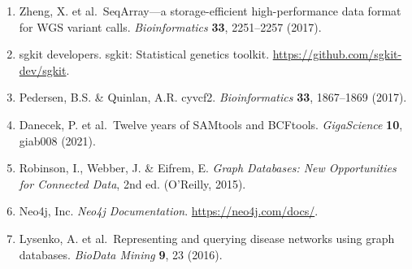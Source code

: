 \documentclass[11pt,a4paper]{article}
\begin{document}
\begin{enumerate}
\item[{[S11]}] Zheng, X. et al.\ SeqArray---a storage-efficient high-performance data format for WGS variant calls. \textit{Bioinformatics} \textbf{33}, 2251--2257 (2017).
\item[{[S12]}] sgkit developers. sgkit: Statistical genetics toolkit. \url{https://github.com/sgkit-dev/sgkit}.
\item[{[S13]}] Pedersen, B.S. \& Quinlan, A.R. cyvcf2. \textit{Bioinformatics} \textbf{33}, 1867--1869 (2017).
\item[{[S14]}] Danecek, P. et al.\ Twelve years of SAMtools and BCFtools. \textit{GigaScience} \textbf{10}, giab008 (2021).
\item[{[S15]}] Robinson, I., Webber, J. \& Eifrem, E. \textit{Graph Databases: New Opportunities for Connected Data}, 2nd ed. (O'Reilly, 2015).
\item[{[S16]}] Neo4j, Inc. \textit{Neo4j Documentation}. \url{https://neo4j.com/docs/}.
\item[{[S17]}] Lysenko, A. et al.\ Representing and querying disease networks using graph databases. \textit{BioData Mining} \textbf{9}, 23 (2016).
\end{enumerate}
\end{document}
